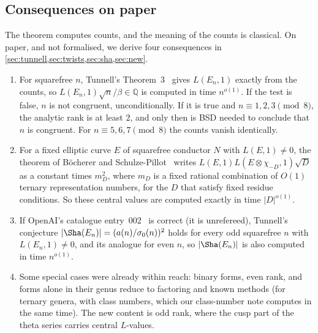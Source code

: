 \documentclass[10pt]{amsart}
\theoremstyle{plain}
\theoremstyle{definition}
\theoremstyle{remark}
\numberwithin{equation}{section}
\newcommand{\Q}{\mathbb{Q}}
\begin{document}
\subsection{Consequences on paper}
The theorem computes counts, and the meaning of the counts is classical. On paper, and not formalised, we
derive four consequences in \cref{sec:tunnell,sec:twists,sec:sha,sec:new}.
\begin{enumerate}[label=(\arabic*)]
\item For squarefree $n$, Tunnell's Theorem~3~\cite{Tun83} gives $L(E_n,1)$ exactly from the counts, so
$L(E_n,1)\sqrt n/\beta\in\Q$ is computed in time $n^{o(1)}$. If the test is false, $n$ is not congruent,
unconditionally. If it is true and $n\equiv1,2,3\pmod8$, the analytic rank is at least $2$, and only then is
BSD needed to conclude that $n$ is congruent. For $n\equiv5,6,7\pmod8$ the counts vanish identically.
\item For a fixed elliptic curve $E$ of squarefree conductor $N$ with $L(E,1)\ne0$, the theorem of
B\"ocherer and Schulze-Pillot~\cite{BSP90} writes $L(E,1)L(E\otimes\chi_{-D},1)\sqrt D$ as a constant times
$m_D^2$, where $m_D$ is a fixed rational combination of $O(1)$ ternary representation numbers, for the $D$ that
satisfy fixed residue conditions. So these central values are computed exactly in time $|D|^{o(1)}$.
\item If OpenAI's catalogue entry~002~\cite{OAI002} is correct (it is unrefereed), Tunnell's conjecture
$|\Sha(E_n)|=(a(n)/\sigma_0(n))^2$ holds for every odd squarefree $n$ with $L(E_n,1)\neq0$, and its analogue
for even $n$, so $|\Sha(E_n)|$ is also
computed in time $n^{o(1)}$.
\item Some special cases were already within reach: binary forms, even rank, and forms alone in their
genus reduce to factoring and known methods (for ternary genera, with class numbers, which our
class-number note computes in the same time). The new content is odd rank, where the cusp part of the
theta series carries central $L$-values.
\end{enumerate}
\end{document}

